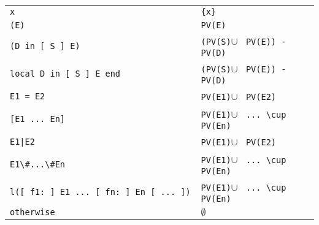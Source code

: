 \documentclass[a4paper]{memoir}
\begin{document}
\begin{appendices}
\begin{tabular} {l l}
\lstinline!x                                       ! & \lstinline!{x} !                                   \\
\lstinline!(E)                                     ! & \lstinline!PV(E) !                                    \\
\lstinline!(D in [ S ] E)                          ! & \lstinline!(PV(S)!$\cup$ \lstinline! PV(E)) - PV(D) !\\
\lstinline!local D in [ S ] E end                  ! & \lstinline!(PV(S)!$\cup$ \lstinline! PV(E)) - PV(D) !\\
\lstinline!E1 = E2                                 ! & \lstinline!PV(E1)!$\cup$ \lstinline! PV(E2)         !\\
\lstinline![E1 ... En]                             ! & \lstinline!PV(E1)!$\cup$ \lstinline! ... \cup PV(En)!\\
\lstinline!E1|E2                                   ! & \lstinline!PV(E1)!$\cup$ \lstinline! PV(E2)         !\\
\lstinline!E1\#...\#En                             ! & \lstinline!PV(E1)!$\cup$ \lstinline! ... \cup PV(En)!\\
\lstinline!l([ f1: ] E1 ... [ fn: ] En [ ... ])    ! & \lstinline!PV(E1)!$\cup$ \lstinline! ... \cup PV(En)!\\
\lstinline!otherwise                               ! &              $\emptyset$                               \\
\end{tabular}

\openany


\end{appendices}
\end{document}
